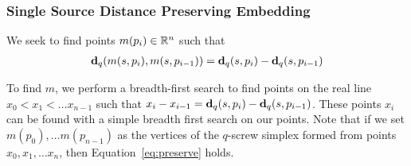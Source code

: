 \subsubsection{Single Source Distance Preserving Embedding} %
\label{sec:lifting}
  
We seek to find points $m(p_i) \in \mathbb{R}^n$ such that 
\begin{align}\label{eq:preserve}
\mathbf{d}_q(m(s,p_i),m(s,p_{i-1})) = \mathbf{d}_q(s, p_i) - \mathbf{d}_q(s,p_{i-1} )
\end{align}

To find $m$, we perform a breadth-first search to find points on the real
line $x_0 < x_1 < \ldots x_{n-1}$ such that $x_i-x_{i-1} = \mathbf{d}_q(s, p_i)
- \mathbf{d}_q(s, p_{i-1})$. These points $x_i$ can be found with a simple
  breadth first search on our points. Note that if we set $m(p_0), \ldots
m(p_{n-1})$ as the vertices of the $q$-screw simplex
formed from points $x_0, x_1, \ldots x_n$, then Equation~\ref{eq:preserve}
holds.


